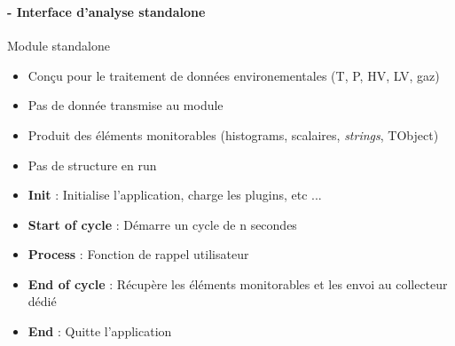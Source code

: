 \documentclass[8pt]{beamer}
\begin{document}
  \begin{frame}
  \frametitle{\secname}
  \framesubtitle{\subsecname - Interface d'analyse standalone}    
    \begin{minipage}{0.78\textwidth}
      \begin{block}{Module standalone}
        \begin{itemize}
          \item Conçu pour le traitement de données environementales (T, P, HV, LV, gaz)
          \item Pas de donnée transmise au module
          \item Produit des éléments monitorables (histograms, scalaires, \textit{strings}, TObject)
          \item Pas de structure en run
        \end{itemize}
      \end{block}
      \begin{itemize}
        \item \textbf{Init} : Initialise l'application, charge les plugins, etc ...
        \item \textbf{Start of cycle} : Démarre un cycle de n secondes
        \item \textbf{Process} : Fonction de rappel utilisateur
        \item \textbf{End of cycle} : Récupère les éléments monitorables et les envoi au collecteur dédié
        \item \textbf{End} : Quitte l'application
      \end{itemize}
    \end{minipage} \hfill
    \begin{minipage}{0.18\textwidth}
      \begin{flushright}
      \end{flushright}
    \end{minipage}
  \end{frame}
\end{document}
